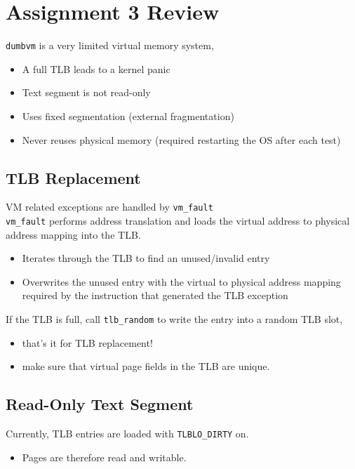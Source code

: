 \documentclass[12pt]{article}
\theoremstyle{plain}
\theoremstyle{definition}
\begin{document}
\newpage
\section{Assignment 3 Review}
\texttt{dumbvm} is a very limited virtual memory system,
\begin{itemize}
  \item A full TLB leads to a kernel panic
  \item Text segment is not read-only
  \item Uses fixed segmentation (external fragmentation)
  \item Never reuses physical memory (required restarting the OS after each test)
\end{itemize}

\subsection{TLB Replacement}
VM related exceptions are handled by \texttt{vm\_fault} \\

\texttt{vm\_fault} performs address translation and loads the virtual address to physical address mapping into the TLB.
\begin{itemize}
  \item Iterates through the TLB to find an unused/invalid entry
  \item Overwrites the unused entry with the virtual to physical address mapping required by the instruction that generated the TLB exception
\end{itemize}

If the TLB is full, call \texttt{tlb\_random} to write the entry into a random TLB slot,
\begin{itemize}
  \item that's it for TLB replacement!
  \item make sure that virtual page fields in the TLB are unique.
\end{itemize}

\subsection{Read-Only Text Segment}
Currently, TLB entries are loaded with \texttt{TLBLO\_DIRTY} on.
\begin{itemize}
  \item Pages are therefore read and writable.
\end{itemize}
\end{document}
